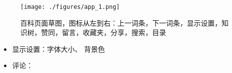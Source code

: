 
\begin{figure}[ht]
\centering
\texttt{[image: ./figures/app\_1.png]}
\caption{百科页面草图，图标从左到右：上一词条，下一词条，显示设置，知识树，赞同，留言，收藏夹，分享，搜索，目录} \label{app_fig1}
\end{figure}


\begin{itemize}
\item 显示设置：字体大小、 背景色
\item 评论：
\end{itemize}
